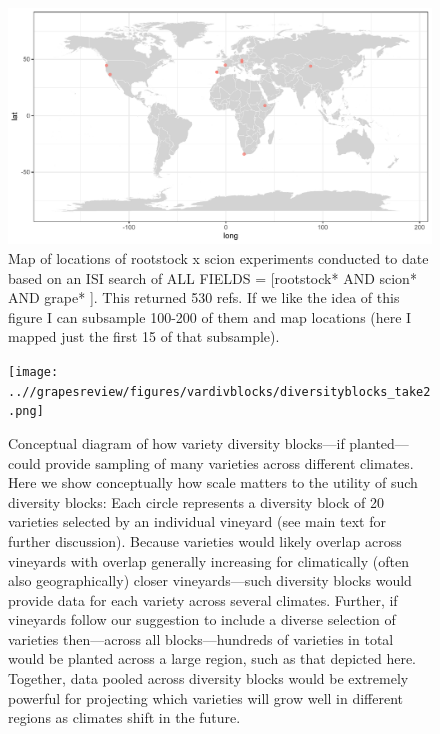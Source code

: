\documentclass[11pt]{article}
\begin{document}
\newpage
\begin{figure}[h!]
\centering
\noindent \includegraphics[width=1\textwidth]{figures/rootstockxscionexpts.pdf}
\caption{Map of locations of rootstock x scion experiments conducted to date based on an ISI search of ALL FIELDS = [rootstock* AND scion* AND grape* ]. This returned 530 refs. If we like the idea of this figure I can subsample 100-200 of them and map locations (here I mapped just the first 15 of that subsample).}
\label{fig:rootstockxscionexpts}
\end{figure}

\newpage
\begin{figure}[h!]
\centering
\noindent \texttt{[image: ..//grapesreview/figures/vardivblocks/diversityblocks\_take2.png]}
\caption{Conceptual diagram of how variety diversity blocks---if planted---could provide sampling of many varieties across different climates. Here we show conceptually how scale matters to the utility of such diversity blocks: Each circle represents a diversity block of 20 varieties selected by an individual  vineyard (see main text for further discussion). Because varieties would likely overlap across vineyards with overlap generally increasing for climatically (often also geographically) closer vineyards---such diversity blocks would provide data for each variety across several climates. Further, if vineyards follow our suggestion to include a diverse selection of varieties then---across all blocks---hundreds of varieties in total would be planted across a large region, such as that depicted here. Together, data pooled across diversity blocks would be extremely powerful for projecting which varieties will grow well in different regions as climates shift in the future.}
\label{fig:divblocks}
\end{figure}
\end{document}
